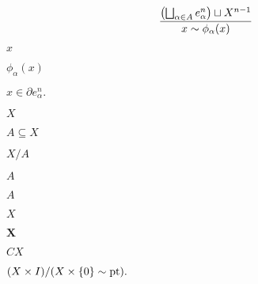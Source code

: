 \documentclass[10pt]{book}
\begin{document}
\begin{mdSnippets}
\begin{mdDisplaySnippet}[657f3e5b8bd2250ee30fe4cfb35e552f]
\[\frac{\qty(\bigsqcup_{\alpha \in A} e_\alpha^n) \sqcup X^{n-1}}{x \sim \phi_\alpha(x)}
\]%
\end{mdDisplaySnippet}%
\begin{mdInlineSnippet}[9dd4e461268c8034f5c8564e155c67a6]%
$x$\end{mdInlineSnippet}%
\begin{mdInlineSnippet}%
$\phi_\alpha(x)$\end{mdInlineSnippet}%
\begin{mdInlineSnippet}%
$x \in \partial e_\alpha^n.$\end{mdInlineSnippet}%
\begin{mdInlineSnippet}[02129bb861061d1a052c592e2dc6b383]%
$X$\end{mdInlineSnippet}%
\begin{mdInlineSnippet}[b3490d104fb2099d4d4b8eab62bc6b69]%
$A \subseteq X$\end{mdInlineSnippet}%
\begin{mdInlineSnippet}%
$X/A$\end{mdInlineSnippet}%
\begin{mdInlineSnippet}[7fc56270e7a70fa81a5935b72eacbe29]%
$A$\end{mdInlineSnippet}%
\begin{mdInlineSnippet}[7fc56270e7a70fa81a5935b72eacbe29]%
$A$\end{mdInlineSnippet}%
\begin{mdInlineSnippet}[02129bb861061d1a052c592e2dc6b383]%
$X$\end{mdInlineSnippet}%
\begin{mdInlineSnippet}%
$\bm{X}$\end{mdInlineSnippet}%
\begin{mdInlineSnippet}%
$CX$\end{mdInlineSnippet}%
\begin{mdInlineSnippet}[756635ec7a8596680ce6012aec4185cb]%
$(X \times I) / (X \times \{0\} \sim \operatorname{pt}).$\end{mdInlineSnippet}%
\begin{mdInlineSnippet}[26d34f122c7d90a3b9b52a8fe00c7c92]%

\end{mdInlineSnippet}
\end{mdSnippets}
\end{document}
